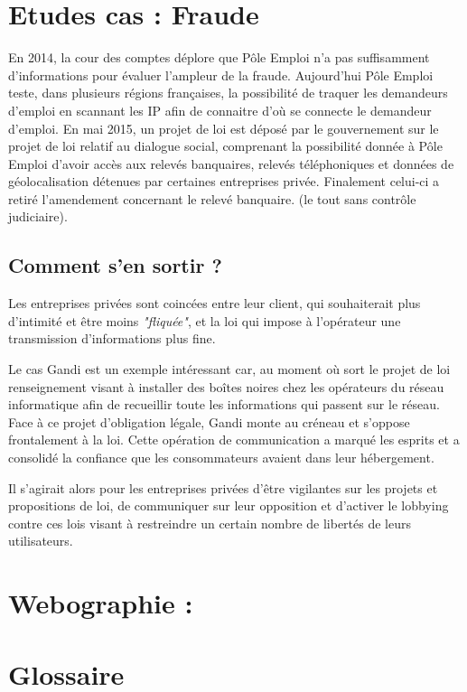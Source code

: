 \documentclass[a4paper,12pt]{article}
\begin{document}
\section{Etudes cas : Fraude }
En 2014, la cour des comptes déplore que Pôle Emploi n'a pas suffisamment d'informations pour évaluer l'ampleur de la fraude. Aujourd'hui Pôle Emploi teste, dans plusieurs régions françaises, la possibilité de traquer les demandeurs d'emploi en scannant les IP afin de connaitre d'où se connecte le demandeur d'emploi. 
En mai 2015, un projet de loi est déposé par le gouvernement sur le projet de loi relatif au dialogue social, comprenant la possibilité donnée à Pôle Emploi d'avoir accès aux relevés banquaires, relevés téléphoniques et données de géolocalisation détenues par certaines entreprises privée. Finalement celui-ci a retiré l'amendement concernant le relevé banquaire. (le tout sans contrôle judiciaire). 
\subsection{Comment s'en sortir ? }
Les entreprises privées sont coincées entre leur client, qui souhaiterait plus d'intimité et être moins \textit{"fliquée"}, et la loi qui impose à l'opérateur une transmission d'informations plus fine. 

Le cas Gandi est un exemple intéressant car, au moment où sort le projet de loi renseignement visant à installer des boîtes noires chez les opérateurs du réseau informatique afin de recueillir toute les informations qui passent sur le réseau. Face à ce projet d'obligation légale, Gandi monte au créneau et s'oppose frontalement à la loi. Cette opération de communication a marqué les esprits et a consolidé la confiance que les consommateurs avaient dans leur hébergement. 

Il s'agirait alors pour les entreprises privées d'être vigilantes sur les projets et propositions de loi, de communiquer sur leur opposition et d'activer le lobbying contre ces lois visant à restreindre un certain nombre de libertés de leurs utilisateurs. 




\newpage 
\section*{Webographie :}
\newpage
\section*{Glossaire}
\end{document}
